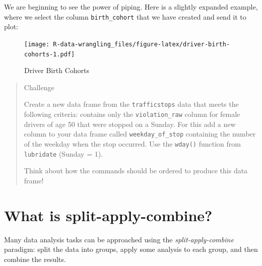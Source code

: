\documentclass[]{book}
\newenvironment{Shaded}{\begin{snugshade}}{\end{snugshade}}
\newcommand{\DataTypeTok}[1]{\textcolor[rgb]{0.13,0.29,0.53}{#1}}
\newcommand{\DecValTok}[1]{\textcolor[rgb]{0.00,0.00,0.81}{#1}}
\newcommand{\KeywordTok}[1]{\textcolor[rgb]{0.13,0.29,0.53}{\textbf{#1}}}
\newcommand{\NormalTok}[1]{#1}
\newcommand{\OperatorTok}[1]{\textcolor[rgb]{0.81,0.36,0.00}{\textbf{#1}}}
\newcommand{\StringTok}[1]{\textcolor[rgb]{0.31,0.60,0.02}{#1}}
\begin{document}
We are beginning to see the power of piping. Here is a slightly expanded example, where we select the column \texttt{birth\_cohort} that we have created and send it to plot:

\begin{Shaded}
\end{Shaded}

\begin{figure}
\centering
\texttt{[image: R-data-wrangling\_files/figure-latex/driver-birth-cohorts-1.pdf]}
\caption{\label{fig:driver-birth-cohorts}Driver Birth Cohorts}
\end{figure}

\begin{quote}
Challenge

Create a new data frame from the \texttt{trafficstops} data that meets the following
criteria: contains only the \texttt{violation\_raw} column for female drivers of age 50 that were stopped on a Sunday. For this add a new column to your data frame called
\texttt{weekday\_of\_stop} containing the number of the weekday when the stop occurred. Use the \texttt{wday()} function from \texttt{lubridate} (Sunday = 1).

Think about how the commands should be ordered to produce this data frame!
\end{quote}

\hypertarget{what-is-split-apply-combine}{%
\section{What is split-apply-combine?}\label{what-is-split-apply-combine}}

Many data analysis tasks can be approached using the \emph{split-apply-combine}
paradigm: split the data into groups, apply some analysis to each group, and
then combine the results.
\end{document}
